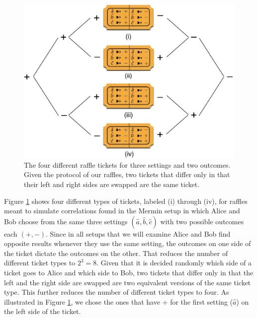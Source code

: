 \begin{figure}[h]
 \centering
   \includegraphics[width=4.5in]{raffle-tickets-3set2out-i-thru-iv.jpeg} 
   \caption{The four different raffle tickets for three settings and two outcomes. Given the protocol of our raffles, two tickets that differ only in that their left and right sides are swapped are the same ticket.}
   \label{raffle-tickets-3set2out-i-thru-iv}
   \end{figure}

Figure \ref{raffle-tickets-3set2out-i-thru-iv} shows four different types of tickets, labeled (i) through (iv), for raffles meant to simulate correlations found in the Mermin setup in which Alice and Bob choose from the same three settings $(\hat{a}, \hat{b}, \hat{c})$ with two possible outcomes each $(+, -)$. Since in all setups that we will examine Alice and Bob find opposite results whenever they use the same setting, the outcomes on one side of the ticket dictate the outcomes on the other. That reduces the number of different ticket types to $2^3 = 8$. Given that it is decided randomly which side of a ticket goes to Alice and which side to Bob, two tickets that differ only in that the left and the right side are swapped are two equivalent versions of the same ticket type. This further reduces the number of different ticket types to four. As illustrated in Figure \ref{raffle-tickets-3set2out-i-thru-iv}, we chose the ones that have $+$ for the first setting ($\hat{a}$) on the left side of the ticket.


